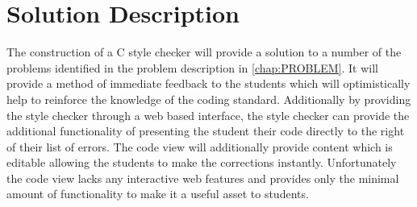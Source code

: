 \chapter{Solution Description}
\label{chap:SOLUTION}

The construction of a C style checker will provide a solution to a number of 
the problems identified in the problem description in \autoref{chap:PROBLEM}.
It will provide a method of immediate feedback to the students which will 
optimistically help to reinforce the knowledge of the coding standard.
Additionally by providing the style checker through a web based interface, 
the style checker can provide the additional functionality of presenting the 
student their code directly to the right of their list of errors. The code 
view will additionally provide content which is editable allowing the students 
to make the corrections instantly. Unfortunately the code view lacks any 
interactive web features and provides only the minimal amount of functionality 
to make it a useful asset to students.

